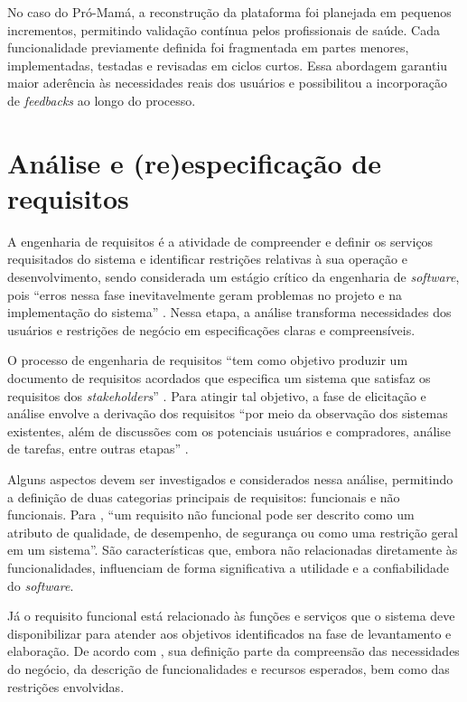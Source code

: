 No caso do Pró-Mamá, a reconstrução da plataforma foi planejada em pequenos incrementos, permitindo validação contínua pelos profissionais de saúde. Cada funcionalidade previamente definida foi fragmentada em partes menores, implementadas, testadas e revisadas em ciclos curtos. Essa abordagem garantiu maior aderência às necessidades reais dos usuários e possibilitou a incorporação de \emph{feedbacks} ao longo do processo.

\section{Análise e (re)especificação de requisitos}

A engenharia de requisitos é a atividade de compreender e definir os serviços requisitados do sistema e identificar restrições relativas à sua operação e desenvolvimento, sendo considerada um estágio crítico da engenharia de \emph{software}, pois ``erros nessa fase inevitavelmente geram problemas no projeto e na implementação do sistema'' \cite[p.~24]{sommerville2011engenharia}. Nessa etapa, a análise transforma necessidades dos usuários e restrições de negócio em especificações claras e compreensíveis.

O processo de engenharia de requisitos ``tem como objetivo produzir um documento de requisitos acordados que especifica um sistema que satisfaz os requisitos dos \emph{stakeholders}'' \cite[p.~24]{sommerville2011engenharia}. Para atingir tal objetivo, a fase de elicitação e análise envolve a derivação dos requisitos ``por meio da observação dos sistemas existentes, além de discussões com os potenciais usuários e compradores, análise de tarefas, entre outras etapas'' \cite[p.~25]{sommerville2011engenharia}.

Alguns aspectos devem ser investigados e considerados nessa análise, permitindo a definição de duas categorias principais de requisitos: funcionais e não funcionais. Para , ``um requisito não funcional pode ser descrito como um atributo de qualidade, de desempenho, de segurança ou como uma restrição geral em um sistema''. São características que, embora não relacionadas diretamente às funcionalidades, influenciam de forma significativa a utilidade e a confiabilidade do \emph{software}.

Já o requisito funcional está relacionado às funções e serviços que o sistema deve disponibilizar para atender aos objetivos identificados na fase de levantamento e elaboração. De acordo com , sua definição parte da compreensão das necessidades do negócio, da descrição de funcionalidades e recursos esperados, bem como das restrições envolvidas.

